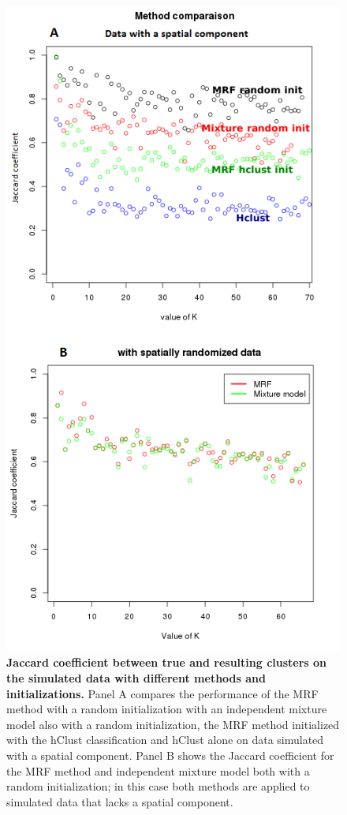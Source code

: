 	\begin{figure}[H]
\centerline{\includegraphics[width=0.9\linewidth]{gfx/chapter5/method_comparison.png}}
\caption{{\bf Jaccard coefficient between true and resulting clusters on the simulated data with different methods and initializations.} Panel A compares the performance of the MRF method with a random initialization with an independent mixture model also with a random initialization, the MRF method initialized with the hClust classification and hClust alone on data simulated with a spatial component. Panel B shows the Jaccard coefficient for the MRF method and independent mixture model both with a random initialization; in this case both methods are applied to simulated data that lacks a spatial component.}
\label{fig:methodComparison}
	\end{figure}

